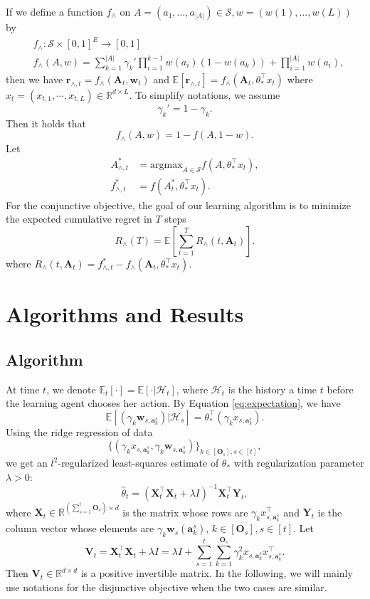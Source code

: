 \documentclass{article}
\newcommand{\EE}{\mathbb{E}}
\newcommand{\RR}{\mathbb{R}}
\newcommand{\bA}{\mathbf{A}}
\newcommand{\ba}{\mathbf{a}}
\newcommand{\bO}{\mathbf{O}}
\newcommand{\br}{\mathbf{r}}
\newcommand{\bV}{\mathbf{V}}
\newcommand{\bw}{\mathbf{w}}
\newcommand{\bX}{\mathbf{X}}
\newcommand{\bY}{\mathbf{Y}}
\newcommand{\cH}{\mathcal{H}}
\newcommand{\cS}{\mathcal{S}}
\newcommand{\argmax}{\mathrm{argmax}}
\newcommand{\abs}[1]{\left| #1 \right|}
\begin{document}
If we define a function $f_{\wedge}$ on $A = (a_1, \ldots, a_{\abs{A}}) \in \cS, w = (w(1), \ldots, w(L))$ by
\begin{align}
&f_{\wedge} : \cS \times [0,1]^E \to [0,1] \nonumber \\
&f_{\wedge}(A,w) = \sum_{k = 1}^{\abs{A}} \gamma_k' \prod_{i = 1}^{k - 1} w(a_i)
 (1 - w(a_k)) + \prod_{i=1}^{\abs{A}}w(a_i),
 \label{eq:functionfstar}
\end{align}
then we have $\br_{\wedge, t} = f_{\wedge}(\bA_t, \bw_t)$ and $\EE[\br_{\wedge, t}] = f_{\wedge}(\bA_t, \theta_{\ast}^{\top}x_t)$ where $x_t = (x_{t,1}, \cdots, x_{t,L}) \in \RR^{d \times L}$. To simplify notations, we assume 
$$
\gamma_k' = 1 - \gamma_k.
$$
Then it holds that
\begin{equation}
\label{eq:ConDisRelation}
f_{\wedge}(A, w) = 1 - f(A, 1 - w).
\end{equation}
Let 
\begin{align*}
A_{\wedge, t}^{\ast} &= \argmax_{A\in \cS} f(A,\theta_{\ast}^{\top}x_t),\\
f_{\wedge, t}^{\ast} &= f(A_t^{\ast}, \theta_{\ast}^{\top}x_t).
\end{align*}
For the conjunctive objective, the goal of our learning algorithm is to minimize the expected cumulative regret in $T$ steps
$$
R_{\wedge}(T) = \EE[\sum_{t=1}^T R_{\wedge}(t, \bA_t)].
$$
where $R_{\wedge}(t, \bA_t) = f_{\wedge, t}^{\ast} - f_{\wedge}(\bA_t, \theta_{\ast}^{\top}x_t)$.



\section{Algorithms and Results}

\subsection{Algorithm}
	
At time $t$, we denote $\EE_t[\cdot] = \EE[\cdot | \cH_t]$, where $\cH_t$ is the history a time $t$ before the learning agent
	chooses her action. 
By Equation \eqref{eq:expectation}, we have 
$$
\EE[(\gamma_k \bw_{s,\ba_k^s}) | \cH_{s}] = \theta_*^{\top} (\gamma_k x_{s,\ba_k^s}).
$$
Using the ridge regression of data 
$$
\{(\gamma_k x_{s,\ba_k^s}, \gamma_k \bw_{s,\ba_k^s})\}_{k \in[\bO_s], s\in[t]},
$$
we get an $l^2$-regularized least-squares estimate of $\theta_*$ with regularization parameter $\lambda > 0$:
\begin{equation}
\hat{\theta}_t = (\bX_t^{\top}\bX_t + \lambda I)^{-1} \bX_t^{\top} \bY_t,
\end{equation}
where $\bX_t \in \RR^{(\sum_{s=1}^{t}\bO_s) \times d}$ is the matrix whose rows are $\gamma_k x_{s,\ba_k^s}^{\top}$ and $\bY_t$ is the column vector whose elements are $\gamma_k \bw_s(\ba_k^s)$, $k \in[\bO_s], s\in[t]$. Let
$$
\bV_t = \bX_t^{\top} \bX_t + \lambda I = \lambda I + \sum_{s=1}^{t} \sum_{k=1}^{\bO_s} \gamma_k^2 x_{s,\ba_k^s}x_{s,\ba_k^s}^{\top}.
$$
Then $\bV_t \in \RR^{d \times d}$ is a positive invertible matrix. 
In the following, we will mainly use notations for the disjunctive objective when the two cases are similar.
\end{document}
